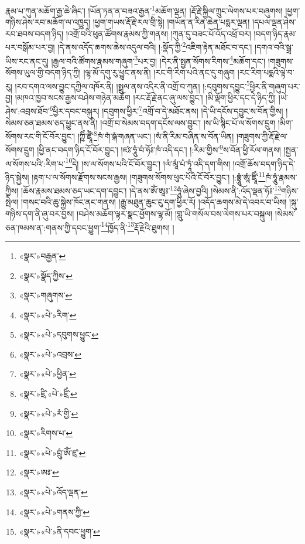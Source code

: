 རྣམ་པ་ཀུན་མཆོག་རྒྱ་ཆེ་ཞིང་། །ཡོན་ཏན་ན་བཟའ་རྒྱན་\footnote{«སྣར་»བརྒྱན་}མཆོག་ལྡན། །རྡོ་རྗེ་སྐྱིལ་ཀྲུང་ལེགས་པར་བཞུགས། །ཕྱག་གཉིས་ཤེས་རབ་མཆོག་ལ་འཁྱུད། །ཕྱག་གཡས་རྡོ་རྗེ་རལ་གྲི་སྟེ། །གཡོན་ན་རིན་ཆེན་པདྨར་ལྡན། །དཔལ་ལྡན་ཤེས་རབ་ཐབས་བདག་ཉིད། །འགྲོ་བའི་ཕུན་ཚོགས་རྣམས་ཀྱི་གནས། །ཀུན་དུ་བཟང་པོ་འོད་འཕྲོ་བར། །བདག་ཉིད་རྣམ་པར་བསྒོམ་པར་བྱ། །དེ་ནས་འདོད་ཆགས་ཆེས་འདུལ་བའི། །:སྣོད་ཀྱི་\footnote{«སྣར་»སྣོད་ཀྱིས་}འཇིག་རྟེན་མཐོང་བ་དང་། །དགའ་བའི་སྒྲ་ཡིས་རང་ནང་དུ། །རྒྱལ་བའི་ཚོགས་རྣམས་གཞུག་\footnote{«སྣར་»གཞུགས་}པར་བྱ། །དེར་ནི་སྤྱན་སོགས་རིགས་\footnote{«སྣར་»«པེ་»རིག་}མཆོག་དང་། །གཟུགས་སོགས་ཡུལ་གྱི་བདག་ཉིད་ཀྱི། །ལྷ་མོ་དགུ་རུ་ཕྱུང་ནས་ནི། །རང་གི་རིག་པའི་ནང་དུ་གཞུག །རང་རིག་པདྨའི་ལྟེ་བ་རུ། །རབ་དགའ་ལས་བྱུང་དཀྱིལ་འཁོར་ནི། །སྤྲུལ་ནས་འདིར་ནི་འགྲོ་བ་ཀུན། །:དབུགས་དབྱུང་\footnote{«སྣར་»«པེ་»དབུགས་ཕྱུང་}ཕྱིར་ནི་གཞུག་པར་བྱ། །མཁའ་ཁྱབ་སངས་རྒྱས་བཤེས་གཉེན་མཆོག །རང་རྡོ་རྗེ་ནང་ཞུ་ལས་བྱུང་། །མི་ལྡོག་ཕྱིར་དང་དེ་ཉིད་ཀྱི། །ཡེ་ཤེས་:འབྲས་ཐོབ་\footnote{«སྣར་»«པེ་»འབྲས་}ཕྱིར་དབང་བསྐུར། །དབུགས་ཕྱིར་\footnote{«སྣར་»«པེ་»ཕྱིན་}འགྲོ་བ་དེ་མཐོང་ནས། །དེ་ཡི་དངོས་དབྱུང་ས་བོན་གྱིས། །སེམས་ཅན་ཐམས་ཅད་ཕྱུང་ནས་ནི། །འགྲོ་བ་སེམས་བདག་དངོས་ལས་བྱུང་། །ས་ཡི་སྙིང་པོ་ལ་སོགས་དྲུག །མིག་སོགས་རང་གི་ངོ་བོར་བྱུང་། །ཀྵིཾ་ཛྲཱྀཾ་\footnote{«སྣར་»ཛྲི་«པེ་»ཛྲིཾ་}ཁཾ་གཾ་ཥྐཾ་གཞན་ཡང་། །སཾ་ནི་རིམ་བཞིན་ས་བོན་ཡིན། །གཟུགས་ཀྱི་རྡོ་རྗེ་ལ་སོགས་དྲུག །ཕྱི་ནང་བདག་ཉིད་ངོ་བོར་བྱུང་། །ཛཿ་ཧཱུཾ་བཾ་ཧོཿ་ཁཾ་འདི་དང་། །:རིམ་གྱིས་\footnote{«སྣར་»«པེ་»རཾ་གྱི་}ས་བོན་ཕྱི་རོལ་གནས། །སྤྱན་ལ་སོགས་པའི་:རིག་པ་\footnote{«སྣར་»རིགས་པ་}དེ། །ས་ལ་སོགས་པའི་ངོ་བོར་བྱུང་། །ལཾ་མཱཾ་པཾ་ཏཱཾ་འདི་དག་གིས། །འགྲོ་ཆོས་བདག་ཉིད་དེ་ཉིད་སྐྱེས། །རྟག་པ་ལ་སོགས་རྫོགས་སངས་རྒྱས། །གཟུགས་སོགས་ཕུང་པོའི་ངོ་བོར་བྱུང་། །:བྷྲཱུཾ་ཨཱཾ་ཛྲཱིཾ་\footnote{«སྣར་»«པེ་»བྲུཾ་ཨོཾ་ཛྲ་}ཁཾ་ཧཱུཾ་རྣམས་ཀྱིས། །ཆོས་རྣམས་ཐམས་ཅད་ཡང་དག་དབྱུང་། །དེ་ནས་ཨོཾ་ཨཱཿ་\footnote{«སྣར་»ཨཿ་}ཧཱུཾ་ཞེས་བྱའི། །སེམས་ནི་:འོད་ལྡན་ཧོཿ་\footnote{«སྣར་»«པེ་»འོད་ལྡན་}གཉིས་སྤེལ། །གསང་བའི་ཆུ་སྐྱེས་ཁོང་ནང་གནས། །རྒྱུ་མཐུན་ཆུང་ངུ་དག་ཕྱིར་རོ། །འདོད་ཆགས་མེ་དེ་འབར་བ་ཡིས། །སྐུ་གཉིས་དག་ནི་ཞུ་བར་བྱས། །བཤེས་མཆོག་ལྟར་སྣང་ཕྱོགས་ལྷ་མོ། །གླུ་ཡི་གསོལ་བས་ལེགས་པར་བསྐུལ། །སེམས་ཅན་ཁམས་ན་:གནས་ཀྱི་དབང་ཕྱུག་\footnote{«སྣར་»«པེ་»གནས་ཀྱི་}ཁྱོད་ནི་\footnote{«སྣར་»«པེ་»ནི་དབང་ཕྱུག་}རྡོ་རྗེའི་ཐུགས། །
